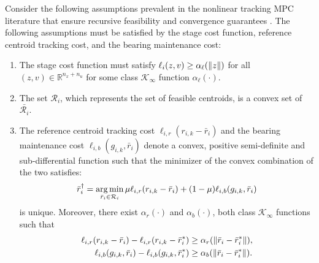 Consider the following assumptions prevalent in the nonlinear tracking MPC literature that ensure recursive feasibility and convergence guarantees \cite{ferramosca2009mpc, limon2008mpc, limon2018nonlinear}. %
The following assumptions must be satisfied by the stage cost function, reference centroid tracking cost, and the bearing maintenance cost:
\begin{assumption}
\label{ass:cost}
\begin{enumerate}
    \item The stage cost function must satisfy $\ell_i(z,v) \geq \alpha_{\ell}(\lVert z\rVert)$ for all $(z,v) \in \mathbb{R}^{n_x+n_u}$ for some class $\mathcal{K}_\infty$ function $\alpha_{\ell}(\cdot)$.
    \item The set $\mathcal{R}_i$, which represents the set of feasible centroids, is a convex set of $\bar{\mathcal{R}_i}$.
    \item The reference centroid tracking cost $\ell_{i,r}(r_{i,k}-\bar{r}_{i})$ and the bearing maintenance cost $\ell_{i,b}(g_{i,k},\bar{r}_{i})$ denote a convex, positive semi-definite and sub-differential function such that the minimizer of the convex combination of the two satisfies:
    \begin{equation}
    \label{eq:offset_cost}
        \bar{r}_i^{\dagger}= \operatorname*{arg\,min}_{\bar{r}_i \in \mathcal{R}_i} \mu \ell_{i,r}(r_{i,k} - \bar{r}_i) + (1-\mu)\ell_{i,b}(g_{i,k}, \bar{r}_i)
    \end{equation}
    is unique. Moreover, there exist $\alpha_r(\cdot)$ and $\alpha_b(\cdot)$, both class $\mathcal{K}_\infty$ functions such that
    \begin{align*}
        \ell_{i,r}(r_{i,k}-\bar{r}_{i}) -  \ell_{i,r}(r_{i,k}-\bar{r}^*_{i}) &\geq \alpha_r(\lVert\bar{r}_i - \bar{r}^*_i\rVert),\\
        \ell_{i,b}(g_{i,k},\bar{r}_{i}) -  \ell_{i,b}(g_{i,k},\bar{r}^*_{i}) &\geq \alpha_b(\lVert\bar{r}_i - \bar{r}^*_i\rVert).
    \end{align*}
\end{enumerate}
\end{assumption}

